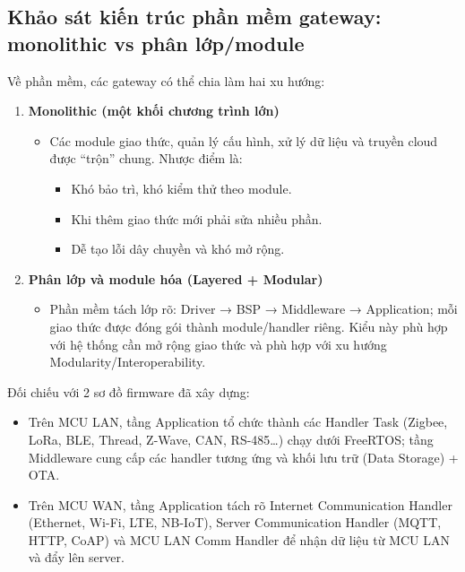     \subsection{Khảo sát kiến trúc phần mềm gateway: monolithic vs phân lớp/module}
        Về phần mềm, các gateway có thể chia làm hai xu hướng:
        \begin{enumerate}
            \item \textbf{Monolithic (một khối chương trình lớn)}
            \begin{itemize}
                \item Các module giao thức, quản lý cấu hình, xử lý dữ liệu và truyền cloud được “trộn” chung. Nhược điểm là:
                \begin{itemize}
                    \item Khó bảo trì, khó kiểm thử theo module.
                    \item Khi thêm giao thức mới phải sửa nhiều phần.
                    \item Dễ tạo lỗi dây chuyền và khó mở rộng.
                \end{itemize}
            \end{itemize}
            
            \item \textbf{Phân lớp và module hóa (Layered + Modular)}
            \begin{itemize}
                \item Phần mềm tách lớp rõ: Driver → BSP → Middleware → Application; mỗi giao thức được đóng gói thành module/handler riêng. Kiểu này phù hợp với hệ thống cần mở rộng giao thức và phù hợp với xu hướng Modularity/Interoperability.
            \end{itemize}
        \end{enumerate}

        Đối chiếu với 2 sơ đồ firmware đã xây dựng:
        \begin{itemize}
            \item Trên MCU LAN, tầng Application tổ chức thành các Handler Task (Zigbee, LoRa, BLE, Thread, Z-Wave, CAN, RS-485\ldots) chạy dưới FreeRTOS; tầng Middleware cung cấp các handler tương ứng và khối lưu trữ (Data Storage) + OTA.
            \item Trên MCU WAN, tầng Application tách rõ Internet Communication Handler (Ethernet, Wi-Fi, LTE, NB-IoT), Server Communication Handler (MQTT, HTTP, CoAP) và MCU LAN Comm Handler để nhận dữ liệu từ MCU LAN và đẩy lên server.
        \end{itemize}


